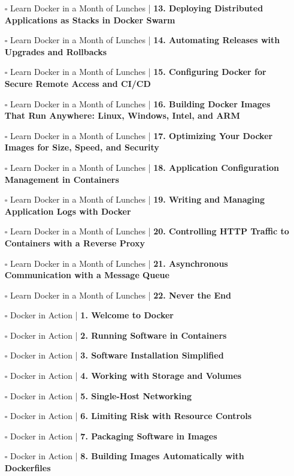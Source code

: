 \documentclass[a4, landscape, 12pt]{article}
\newcommand{\checkbox}{$\square$}%
\begin{document}
\begin{itemize}
{}
\item [\checkbox]  Learn Docker in a Month of Lunches | \textbf{ 13. Deploying Distributed Applications as Stacks in Docker Swarm
}
\item [\checkbox]  Learn Docker in a Month of Lunches | \textbf{ 14. Automating Releases with Upgrades and Rollbacks
}
\item [\checkbox]  Learn Docker in a Month of Lunches | \textbf{ 15. Configuring Docker for Secure Remote Access and CI/CD
}
\item [\checkbox]  Learn Docker in a Month of Lunches | \textbf{ 16. Building Docker Images That Run Anywhere: Linux, Windows, Intel, and ARM
}
\item [\checkbox]  Learn Docker in a Month of Lunches | \textbf{ 17. Optimizing Your Docker Images for Size, Speed, and Security
}
\item [\checkbox]  Learn Docker in a Month of Lunches | \textbf{ 18. Application Configuration Management in Containers
}
\item [\checkbox]  Learn Docker in a Month of Lunches | \textbf{ 19. Writing and Managing Application Logs with Docker
}
\item [\checkbox]  Learn Docker in a Month of Lunches | \textbf{ 20. Controlling HTTP Traffic to Containers with a Reverse Proxy
}
\item [\checkbox]  Learn Docker in a Month of Lunches | \textbf{ 21. Asynchronous Communication with a Message Queue
}
\item [\checkbox]  Learn Docker in a Month of Lunches | \textbf{ 22. Never the End
}
\item [\checkbox]  Docker in Action | \textbf{ 1. Welcome to Docker
}
\item [\checkbox]  Docker in Action | \textbf{ 2. Running Software in Containers
}
\item [\checkbox]  Docker in Action | \textbf{ 3. Software Installation Simplified
}
\item [\checkbox]  Docker in Action | \textbf{ 4. Working with Storage and Volumes
}
\item [\checkbox]  Docker in Action | \textbf{ 5. Single-Host Networking
}
\item [\checkbox]  Docker in Action | \textbf{ 6. Limiting Risk with Resource Controls
}
\item [\checkbox]  Docker in Action | \textbf{ 7. Packaging Software in Images
}
\item [\checkbox]  Docker in Action | \textbf{ 8. Building Images Automatically with Dockerfiles
}
\end{itemize}
\end{document}
